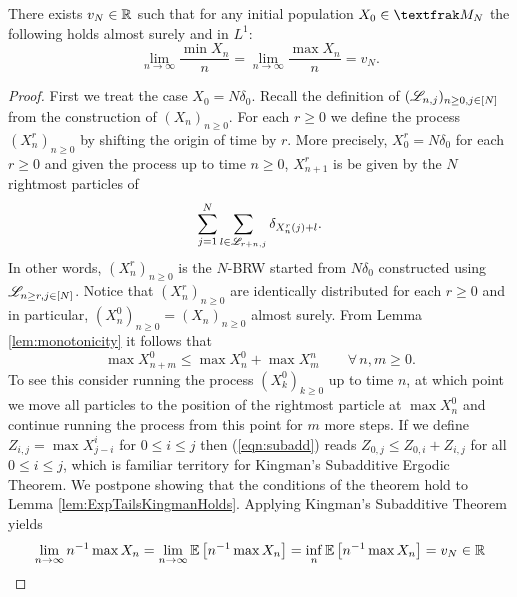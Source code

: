 \begin{proposition}\label{prop:ExpTailsSpeedExistence}
There exists $v_N \in \mathbb{R}$ such that for any initial population $X_0 \in \frak{M}_N$ the following holds almost surely and in $L^1$:
\begin{equation}\nonumber
\lim\limits_{n \to \infty} \frac{\min X_n}{n} = \lim\limits_{n \to \infty} \frac{\max X_n}{n} = v_N. 
\end{equation}
\end{proposition}

\begin{proof}
First we treat the case $X_0 = N \delta_0$. Recall the definition of $(\mathscr{L}_{n, j})_{n \geq 0, j \in [N]}$ from the construction of $(X_n)_{n \geq 0}$. For each $r \geq 0$ we define the process $(X^r_n)_{n \geq 0}$ by shifting the origin of time by $r$. More precisely, $X^r_0 = N \delta_0$ for each $r \geq 0$ and given the process up to time $n \geq 0$, $X^r_{n+1}$ is be given by the $N$ rightmost particles of 
\begin{equation}\nonumber
\sum_{j = 1}^N \sum_{l \in \mathscr{L}_{r + n, j}} \delta_{X^r_n(j) + l}. 
\end{equation}
In other words, $(X^r_n)_{n \geq 0}$ is the $N$-BRW started from $N \delta_0$ constructed using $\mathscr{L}_{n \geq r, j \in [N]}$. Notice that $(X^r_n)_{n \geq 0}$ are identically distributed for each $r \geq 0$ and in particular, $(X^0_n)_{n \geq 0} = (X_n)_{n \geq 0}$ almost surely. From Lemma \ref{lem:monotonicity} it follows that 
\begin{equation}\label{eqn:subadd}
\max X^0_{n + m} \leq \max X^0_n + \max X^n_m \qquad \forall\, n,m \geq 0. 
\end{equation}
To see this consider running the process $(X^0_k)_{k \geq 0}$ up to time $n$, at which point we move all particles to the position of the rightmost particle at $\max X^0_n$ and continue running the process from this point for $m$ more steps. If we define $Z_{i,j} = \max X^i_{j - i}$ for $0 \leq i \leq j$ then (\ref{eqn:subadd}) reads $Z_{0, j} \leq Z_{0,i} + Z_{i,j}$ for all $0 \leq i \leq j$, which is familiar territory for Kingman's Subadditive Ergodic Theorem. We postpone showing that the conditions of the theorem hold to Lemma \ref{lem:ExpTailsKingmanHolds}. Applying Kingman's Subadditive Theorem yields 
\begin{equation}\nonumber
\lim_{n \to \infty} n^{-1} \max X_n = \lim_{n \to \infty} \mathbb{E}\left[ n^{-1} \max X_n \right] = \inf_n \mathbb{E}\left[ n^{-1} \max X_n \right] = v_N \in \mathbb{R}
\end{equation}

\end{proof}
